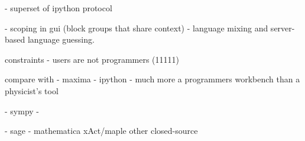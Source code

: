 \documentclass[11pt]{article}
\begin{document}
- superset of ipython protocol

- scoping in gui (block groups that share context)
- language mixing and server-based language guessing.



constraints
  - users are not programmers (11111)



compare with
  - maxima
  - ipython
     - much more a programmers workbench than a physicist's tool

  - sympy
     - 

  - sage
  - mathematica xAct/maple other closed-source
\end{document}
